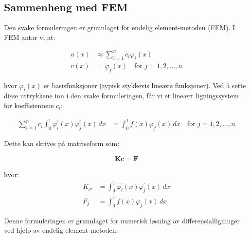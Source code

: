 \subsection{Sammenheng med FEM}

Den svake formuleringen er grunnlaget for endelig element-metoden (FEM).
I FEM antar vi at:

\begin{align*}
	u(x) & \approx \sum_{i=1}^n c_i \varphi_i(x)        \\
	v(x) & = \varphi_j(x) \quad \text{for } j=1,2,...,n
\end{align*}

hvor $\varphi_i(x)$ er basisfunksjoner (typisk stykkevis lineære funksjoner). Ved å sette disse uttrykkene inn i den svake formuleringen, får vi et lineært ligningssystem for koeffisientene $c_i$:

\begin{align*}
	\sum_{i=1}^n c_i \int_0^1 \varphi_i^{\prime}(x) \varphi_j^{\prime}(x) \, dx & = \int_0^1 f(x) \varphi_j(x) \, dx \quad \text{for } j=1,2,...,n
\end{align*}

Dette kan skrives på matriseform som:

\begin{align*}
	\mathbf{K} \mathbf{c} = \mathbf{F}
\end{align*}

hvor:
\begin{align*}
	K_{ji} & = \int_0^1 \varphi_i^{\prime}(x) \varphi_j^{\prime}(x) \, dx \\
	F_j    & = \int_0^1 f(x) \varphi_j(x) \, dx
\end{align*}

Denne formuleringen er grunnlaget for numerisk løsning av differensialligninger ved hjelp av endelig element-metoden.

